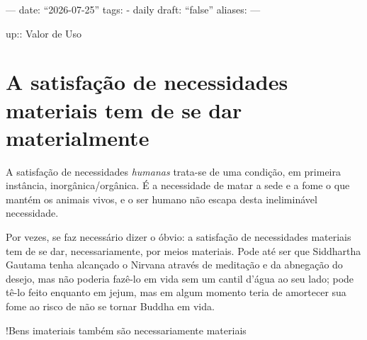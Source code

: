 ---
date: ``2026-07-25''
tags:
  - daily
draft: ``false''
aliases:
---

up:: Valor de Uso

\section{A satisfação de necessidades materiais tem de se dar materialmente}
A satisfação de necessidades \textit{humanas} trata-se de uma condição, em primeira instância, inorgânica/orgânica. É a necessidade de matar a sede e a fome o que mantém os animais vivos, e o ser humano não escapa desta ineliminável necessidade. 

Por vezes, se faz necessário dizer o óbvio: a satisfação de necessidades materiais tem de se dar, necessariamente, por meios materiais. Pode até ser que Siddhartha Gautama tenha alcançado o Nirvana através de meditação e da abnegação do desejo, mas não poderia fazê-lo em vida sem um cantil d'água ao seu lado; pode tê-lo feito enquanto em jejum, mas em algum momento teria de amortecer sua fome ao risco de não se tornar Buddha em vida.

!Bens imateriais também são necessariamente materiais

